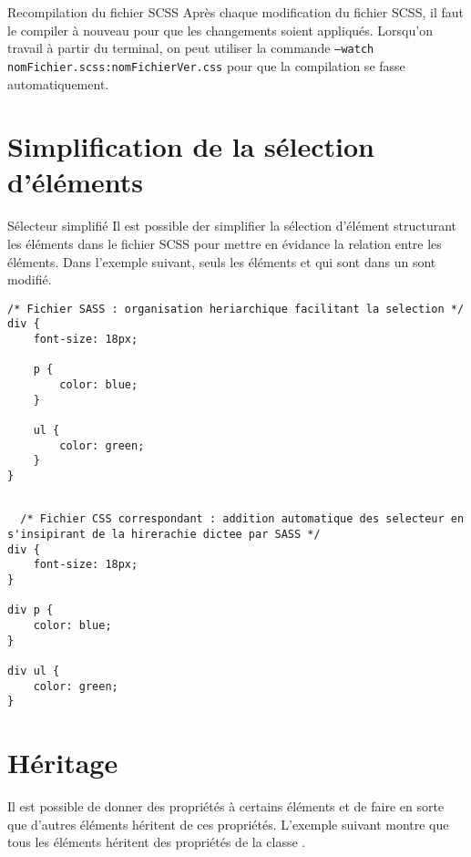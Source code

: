 \documentclass{report}
\begin{document}
\begin{Remarque*}{Recompilation du fichier SCSS}{}
Après chaque modification du fichier SCSS, il faut le compiler à nouveau pour que les changements soient appliqués.
Lorsqu'on travail à partir du terminal, on peut utiliser la commande \texttt{\footnotesize{--watch nomFichier.scss:nomFichierVer.css}} pour que la compilation se fasse automatiquement.  
\end{Remarque*}



\section{Simplification de la sélection d'éléments}
\begin{Syntaxe*}{Sélecteur simplifié}{}
	Il est possible der simplifier la sélection d'élément structurant les éléments dans le fichier SCSS
	pour mettre en évidance la relation entre les éléments. Dans l'exemple suivant, seuls les éléments  et  qui sont dans un 
	 sont modifié.
\end{Syntaxe*}


\begin{ExampleDdHTML*}{}{}
  \begin{lstlisting}[style=CSSDraculaDark]
  /* Fichier SASS : organisation heriarchique facilitant la selection */
div {
    font-size: 18px;

    p {
        color: blue;
    }

    ul {
        color: green;
    }
}
  \end{lstlisting}
    \begin{lstlisting}[style=CSSDraculaDark]
  
  /* Fichier CSS correspondant : addition automatique des selecteur en s'insipirant de la hirerachie dictee par SASS */
div {
    font-size: 18px;
}

div p {
    color: blue;
}

div ul {
    color: green;
}
	\end{lstlisting}

\end{ExampleDdHTML*}



\section{Héritage}
\noindent Il est possible de donner des propriétés à certains éléments et de faire en sorte que d'autres éléments héritent
de ces propriétés. L'exemple suivant montre que tous les éléments 
héritent des propriétés de la classe . 
\end{document}
